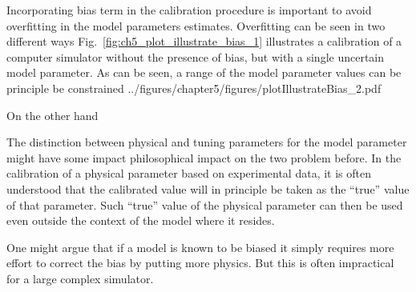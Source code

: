 Incorporating bias term in the calibration procedure is important to avoid overfitting in the model parameters estimates.
Overfitting can be seen in two different ways
Fig.~\ref{fig:ch5_plot_illustrate_bias_1} illustrates a calibration of a computer simulator without the presence of bias, but with a single uncertain model parameter.
As can be seen, a range of the model parameter values can be principle be constrained 
{../figures/chapter5/figures/plotIllustrateBias_2.pdf}

On the other hand

The distinction between physical and tuning parameters for the model parameter might have some impact philosophical impact on the two problem before.
In the calibration of a physical parameter based on experimental data,
it is often understood that the calibrated value will in principle be taken as the ``true'' value of that parameter.
Such ``true'' value of the physical parameter can then be used even outside the context of the model where it resides.

One might argue that if a model is known to be biased it simply requires more effort to correct the bias by putting more physics.
But this is often impractical for a large complex simulator.



